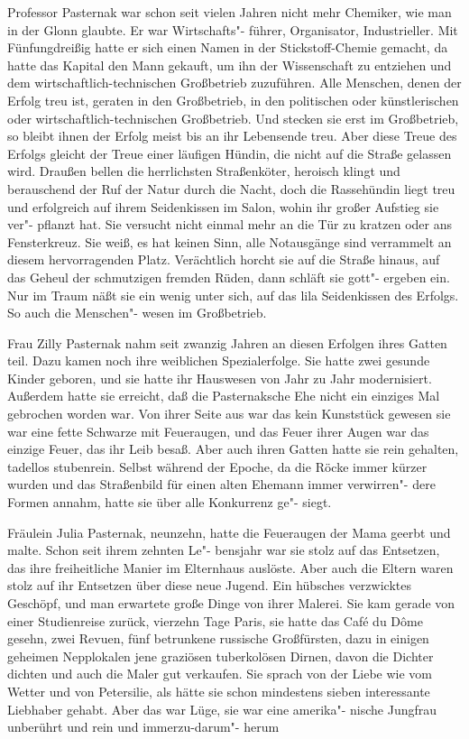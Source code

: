 

Professor Pasternak war schon seit vielen Jahren nicht mehr
Chemiker, wie man in der Glonn glaubte. Er war Wirtschafts"-%
führer, Organisator, Industrieller. Mit Fünfungdreißig hatte
er sich einen Namen in der Stickstoff-Chemie gemacht, da
hatte das Kapital den Mann gekauft, um ihn der Wissenschaft
zu entziehen und dem wirtschaftlich-technischen Großbetrieb
zuzuführen. Alle Menschen, denen der Erfolg treu ist, geraten
in den Großbetrieb, in den politischen oder künstlerischen
oder wirtschaftlich-technischen Großbetrieb. Und stecken sie erst
im Großbetrieb, so bleibt ihnen der Erfolg meist bis an ihr
Lebensende treu. Aber diese Treue des Erfolgs gleicht der
Treue einer läufigen Hündin, die nicht auf die Straße gelassen
wird. Draußen bellen die herrlichsten Straßenköter, heroisch
klingt und berauschend der Ruf der Natur durch die Nacht,
doch die Rassehündin liegt treu und erfolgreich auf ihrem
Seidenkissen im Salon, wohin ihr großer Aufstieg sie ver"-%
pflanzt hat. Sie versucht nicht einmal mehr an die Tür zu
kratzen oder ans Fensterkreuz. Sie weiß, es hat keinen Sinn,
alle Notausgänge sind verrammelt an diesem hervorragenden
Platz. Verächtlich horcht sie auf die Straße hinaus, auf das
Geheul der schmutzigen fremden Rüden, dann schläft sie gott"-%
ergeben ein. Nur im Traum näßt sie ein wenig unter sich,
auf das lila Seidenkissen des Erfolgs. So auch die Menschen"-%
wesen im Großbetrieb.

Frau Zilly Pasternak nahm seit zwanzig Jahren an diesen
Erfolgen ihres Gatten teil. Dazu kamen noch ihre weiblichen
Spezialerfolge. Sie hatte zwei gesunde Kinder geboren,
und sie hatte ihr Hauswesen von Jahr zu Jahr modernisiert.
Außerdem hatte sie erreicht, daß die Pasternaksche Ehe nicht
ein einziges Mal gebrochen worden war. Von ihrer Seite
aus war das kein Kunststück gewesen\dopp{} sie war eine fette
Schwarze mit Feueraugen, und das Feuer ihrer Augen
war das einzige Feuer, das ihr Leib besaß. Aber auch ihren
Gatten hatte sie rein gehalten, tadellos stubenrein. Selbst
während der Epoche, da die Röcke immer kürzer wurden und
das Straßenbild für einen alten Ehemann immer verwirren"-%
dere Formen annahm, hatte sie über alle Konkurrenz ge"-%
siegt.

Fräulein Julia Pasternak, neunzehn, hatte die Feueraugen
der Mama geerbt und malte. Schon seit ihrem zehnten Le"-%
bensjahr war sie stolz auf das Entsetzen, das ihre freiheitliche
Manier im Elternhaus auslöste. Aber auch die Eltern waren
stolz auf ihr Entsetzen über diese neue Jugend. Ein hübsches
verzwicktes Geschöpf, und man erwartete große Dinge von
ihrer Malerei. Sie kam gerade von einer Studienreise zurück,
vierzehn Tage Paris, sie hatte das Café du Dôme gesehn,
zwei Revuen, fünf betrunkene russische Großfürsten, dazu
in einigen geheimen Nepplokalen jene graziösen tuberkolösen
Dirnen, davon die Dichter dichten und auch die Maler gut
verkaufen. Sie sprach von der Liebe wie vom Wetter und von
Petersilie, als hätte sie schon mindestens sieben interessante
Liebhaber gehabt. Aber das war Lüge, sie war eine amerika"-%
nische Jungfrau\dopp{} unberührt und rein und immerzu-darum"-%
herum

